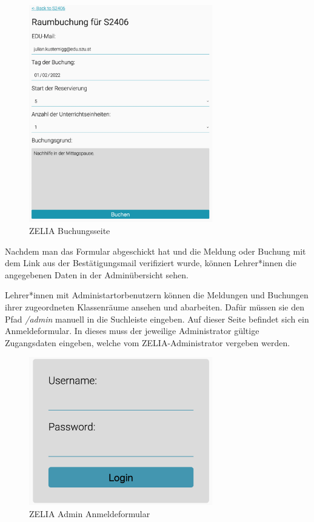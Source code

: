 \begin{figure}[H]
    \centering
    \includegraphics[width=80mm]{media/WebComponents/Buchungsseite_light.png}
    \caption{ZELIA Buchungsseite}
\end{figure}

Nachdem man das Formular abgeschickt hat und die Meldung oder Buchung mit dem Link aus der Bestätigungsmail verifiziert wurde, können Lehrer*innen die angegebenen Daten in der Adminübersicht sehen.


Lehrer*innen mit Administartorbenutzern können die Meldungen und Buchungen ihrer zugeordneten Klassenräume ansehen und abarbeiten. Dafür müssen sie den Pfad \emph{/admin} manuell in die Suchleiste eingeben. Auf dieser Seite befindet sich ein Anmeldeformular. In dieses muss der jeweilige Administrator gültige Zugangsdaten eingeben, welche vom ZELIA-Administrator vergeben werden. 

\begin{figure}[H]
    \centering
    \includegraphics[width=80mm]{media/WebComponents/Login_light.png}
    \caption{ZELIA Admin Anmeldeformular}
\end{figure}

